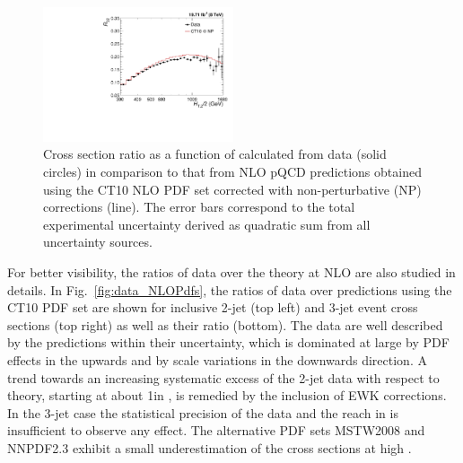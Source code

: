 \begin{figure}[!h]
 \begin{center}
 \includegraphics[width=0.50\textwidth]{Plots_HT_2_150/Sensitivity_ratio_32_CT10_only.pdf}%
 \caption{Cross section ratio \ratio as a function of \httwo calculated from data (solid circles) in comparison to that from NLO pQCD predictions obtained using the CT10 NLO PDF set corrected with non-perturbative (NP) corrections (line). The error bars correspond to the total experimental uncertainty derived as quadratic sum from all uncertainty sources.}
 \label{fig:ratiosens}
 \end{center}
\end{figure}


For better visibility, the ratios of data over the theory at NLO are also studied in details. In Fig.~\ref{fig:data_NLOPdfs}, the ratios of data over \NLOJETPP predictions using the CT10 PDF set are shown for inclusive 2-jet (top left) and 3-jet event cross sections (top right) as well as their ratio \ratio (bottom). The data are well described by the predictions within their uncertainty, which is dominated at large \httwo by PDF effects in the upwards and by scale variations in the downwards direction. A trend towards an increasing systematic excess of the 2-jet data with respect to theory, starting at about 1\TeV in \httwo, is remedied by the inclusion of EWK corrections. In the 3-jet case the statistical precision of the data and the reach in \httwo is insufficient to observe any effect. The alternative PDF sets MSTW2008 and NNPDF2.3 exhibit a small underestimation of the cross sections at high \httwo.

